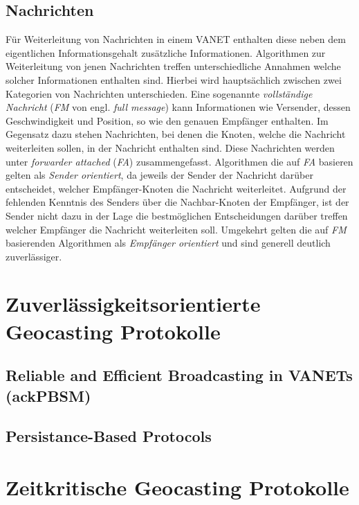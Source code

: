\documentclass[english,runningheads,a4paper]{llncs}[2018/03/10]
\begin{document}
\subsection{Nachrichten}
Für Weiterleitung von Nachrichten in einem VANET enthalten diese neben dem eigentlichen Informationsgehalt zusätzliche Informationen.
Algorithmen zur Weiterleitung von jenen Nachrichten treffen unterschiedliche Annahmen welche solcher Informationen enthalten sind.
Hierbei wird hauptsächlich zwischen zwei Kategorien von Nachrichten unterschieden.
Eine sogenannte \textit{vollständige Nachricht} (\textit{FM} von engl. \textit{full message}) kann Informationen wie Versender, dessen Geschwindigkeit und Position, so wie den genauen Empfänger enthalten.
Im Gegensatz dazu stehen Nachrichten, bei denen die Knoten, welche die Nachricht weiterleiten sollen, in der Nachricht enthalten sind.
Diese Nachrichten werden unter \textit{forwarder attached} (\textit{FA}) zusammengefasst.
Algorithmen die auf \textit{FA} basieren gelten als \textit{Sender orientiert}, da jeweils der Sender der Nachricht darüber entscheidet, welcher Empfänger-Knoten die Nachricht weiterleitet.
Aufgrund der fehlenden Kenntnis des Senders über die Nachbar-Knoten der Empfänger, ist der Sender nicht dazu in der Lage die bestmöglichen Entscheidungen darüber treffen welcher Empfänger die Nachricht weiterleiten soll.
Umgekehrt gelten die auf \textit{FM} basierenden Algorithmen als \textit{Empfänger orientiert} und sind generell deutlich zuverlässiger.



\section{Zuverlässigkeitsorientierte Geocasting Protokolle}
\label{sec:reliabiltyorientedgeoprotocolls}

\subsection{Reliable and Efficient Broadcasting in VANETs (ackPBSM)}

\subsection{Persistance-Based Protocols}

\section{Zeitkritische Geocasting Protokolle}
\label{sec:timecriticalgeoprotocolls}
\end{document}
